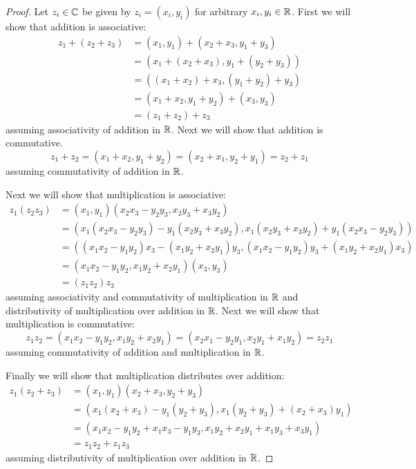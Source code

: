 \documentclass{article}
\begin{document}
    \begin{proof}
        Let \(z_i \in \mathbb{C}\) be given by \(z_i = (x_i, y_i)\) for arbitrary \(x_i, y_i\in\mathbb{R}\).
        First we will show that addition is associative:
        \begin{align*}
            z_1 + (z_2 + z_3) &= (x_1, y_1) + (x_2 + x_3, y_1 + y_3)\\
            &= (x_1 + (x_2 + x_3), y_1 + (y_2 + y_3))\\
            &= ((x_1 + x_2) + x_3, (y_1 + y_2) + y_3)\\
            &= (x_1 + x_2, y_1 + y_2) + (x_3, y_3)\\
            &= (z_1 + z_2) + z_3
        \end{align*}
        assuming associativity of addition in \(\mathbb{R}\).
        Next we will show that addition is commutative.
        \[z_1 + z_2 = (x_1 + x_2, y_1 + y_2) = (x_2 + x_1, y_2 + y_1) = z_2 + z_1\]
        assuming commutativity of addition in \(\mathbb{R}\).
        
        Next we will show that multiplication is associative:
        \begin{align*}
            z_1(z_2z_3) &= (x_1, y_1)(x_2x_3 - y_2y_3, x_2y_3 + x_3y_2)\\
            &= (x_1(x_2x_3 - y_2y_3) - y_1(x_2y_3 + x_3y_2), x_1(x_2y_3 + x_3y_2) + y_1(x_2x_3 - y_2y_3))\\
            &= ((x_1x_2 - y_1y_2)x_3 - (x_1y_2 + x_2y_1)y_3, (x_1x_2 - y_1y_2)y_3 + (x_1y_2 + x_2y_1)x_3)\\
            &= (x_1x_2 - y_1y_2, x_1y_2 + x_2y_1)(x_3, y_3)\\
            &= (z_1z_2)z_3
        \end{align*}
        assuming associativity and commutativity of multiplication in \(\mathbb{R}\) and distributivity of multiplication over addition in \(\mathbb{R}\).
        Next we will show that multiplication is commutative:
        \[z_1z_2 = (x_1x_2 - y_1y_2, x_1y_2 + x_2y_1) = (x_2x_1 - y_2y_1, x_2y_1 + x_1y_2) = z_2z_1\]
        assuming commutativity of addition and multiplication in \(\mathbb{R}\).
        
        Finally we will show that multiplication distributes over addition:
        \begin{align*}
            z_1(z_2 + z_3) &= (x_1, y_1)(x_2 + x_3, y_2 + y_3)\\
            &= (x_1(x_2 + x_3) - y_1(y_2 + y_3), x_1(y_2 + y_3) + (x_2 + x_3)y_1)\\
            &= (x_1x_2 - y_1y_2 + x_1x_3 - y_1y_3, x_1y_2 + x_2y_1 + x_1y_3 + x_3y_1)\\
            &= z_1z_2 + z_1z_3
        \end{align*}
        assuming distributivity of multiplication over addition in \(\mathbb{R}\).
    \end{proof}
\end{document}
